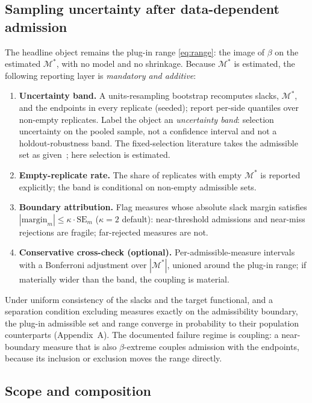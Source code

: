\documentclass[10pt,letterpaper]{article}
\newcommand{\M}{\ensuremath{\mathcal{M}}}
\begin{document}
\subsection{Sampling uncertainty after data-dependent admission}
\label{sec:uncertainty}

The headline object remains the plug-in range \eqref{eq:range}: the image of $\beta$ on the estimated $\M^*$, with no model and no shrinkage.
Because $\M^*$ is estimated, the following reporting layer is \emph{mandatory and additive}:
\begin{enumerate}[label=(\roman*)]
\item \textbf{Uncertainty band.}
A units-resampling bootstrap recomputes slacks, $\M^*$, and the endpoints in every replicate (seeded); report per-side quantiles over non-empty replicates.
Label the object an \emph{uncertainty band}: selection uncertainty on the pooled sample, not a confidence interval and not a holdout-robustness band.
The fixed-selection literature takes the admissible set as given~\cite{imbensmanski2004,stoye2009}; here selection is estimated.
\item \textbf{Empty-replicate rate.}
The share of replicates with empty $\M^*$ is reported explicitly; the band is conditional on non-empty admissible sets.
\item \textbf{Boundary attribution.}
Flag measures whose absolute slack margin satisfies $|\mathrm{margin}_m|\le\kappa\cdot\mathrm{SE}_m$ ($\kappa=2$ default): near-threshold admissions and near-miss rejections are fragile; far-rejected measures are not.
\item \textbf{Conservative cross-check (optional).}
Per-admissible-measure intervals with a Bonferroni adjustment over $|\M^*|$, unioned around the plug-in range; if materially wider than the band, the coupling is material.
\end{enumerate}
Under uniform consistency of the slacks and the target functional, and a separation condition excluding measures exactly on the admissibility boundary, the plug-in admissible set and range converge in probability to their population counterparts (Appendix~A).
The documented failure regime is coupling: a near-boundary measure that is also $\beta$-extreme couples admission with the endpoints, because its inclusion or exclusion moves the range directly.

\subsection{Scope and composition}
\label{sec:scope}
\end{document}
